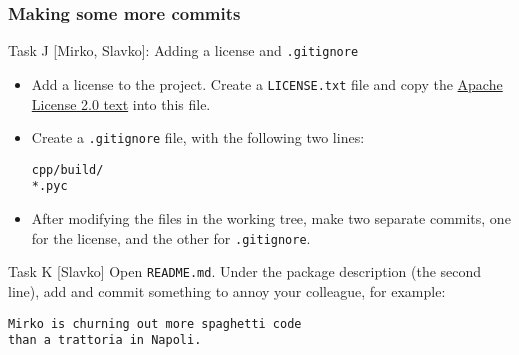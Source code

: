 
\begin{frame}[fragile]

\frametitle{Making some more commits}

\begin{block}{Task J [Mirko, Slavko]: Adding a license and \texttt{.gitignore}}
	\begin{itemize}
	\item Add a license to the project. Create a \texttt{LICENSE.txt} file and copy the \href{https://www.apache.org/licenses/LICENSE-2.0.txt}{Apache License 2.0 text} into this file.
	\item Create a \texttt{.gitignore} file, with the following two lines:
	\begin{verbatim}
cpp/build/
*.pyc
	\end{verbatim}
	\item After modifying the files in the working tree, make two separate commits, one for the license, and the other for \texttt{.gitignore}.
	\end{itemize}
\end{block}

\begin{block}{Task K [Slavko]}
	Open \texttt{README.md}. Under the package description (the second line), add and commit something to annoy your colleague, for example:
	\begin{verbatim}
Mirko is churning out more spaghetti code
than a trattoria in Napoli.
	\end{verbatim}
\end{block}

\end{frame}


